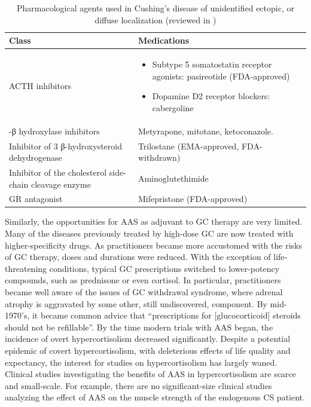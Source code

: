 \documentclass[12pt,english]{report}\usepackage[]{graphicx}\usepackage[]{color}
\providecommand{\tabularnewline}{\\}
\begin{document}
\begin{table}
\begin{tabular}{|>{\centering}m{}|>{\raggedright}p{}|}
\hline 
Class &
Medications\tabularnewline
\hline 
\hline 
ACTH inhibitors &
\begin{itemize}
\item Subtype 5 somatostatin receptor agonists: pasireotide (FDA-approved)\citep{colao201212-month}
\item Dopamine D2 receptor blockers: cabergoline\end{itemize}
\tabularnewline
\hline 
11-β hydroxylase inhibitors &
Metyrapone, mitotane, ketoconazole.\tabularnewline
\hline 
Inhibitor of 3 β-hydroxysteroid dehydrogenase &
Trilostane (EMA-approved, FDA-withdrawn)\citep{komanicky1978treatment}\tabularnewline
\hline 
Inhibitor of the cholesterol side-chain cleavage enzyme &
Aminoglutethimide\tabularnewline
\hline 
GR antagonist &
Mifepristone (FDA-approved)\citep{nieman1985successful}\tabularnewline
\hline 
\end{tabular}

\protect\caption{\label{tab:Pharmacological-unoperable-Cushing-disease}Pharmacological
agents used in Cushing's disease of unidentified ectopic, or diffuse
localization (reviewed in \citep{newell-price2006cushings,molitch2014current})}
\end{table}


Similarly, the opportunities for AAS as adjuvant to GC therapy are
very limited. Many of the diseases previously treated by high-dose
GC are now treated with higher-specificity drugs. As practitioners
became more accustomed with the risks of GC therapy, doses and durations
were reduced. With the exception of life-threatening conditions, typical
GC prescriptions switched to lower-potency compounds, such as prednisone
or even cortisol. In particular, practitioners became well aware of
the issues of GC withdrawal syndrome, where adrenal atrophy is aggravated
by some other, still undiscovered, component\citep{amatruda1960study}.
By mid-1970's, it became common advice that ``prescriptions for {[}glucocorticoid{]}
steroids should not be refillable''\citep{bergner1976rational}.
By the time modern trials with AAS began, the incidence of overt hypercortisolism
decreased significantly. Despite a potential epidemic of covert hypercortisolism,
with deleterious effects of life quality and expectancy, the interest
for studies on hypercortisolism has largely waned. Clinical studies
investigating the benefits of AAS in hypercortisolism are scarce and
small-scale. For example, there are no significant-size clinical studies
analyzing the effect of AAS on the muscle strength of the endogenous
CS patient.
\end{document}
